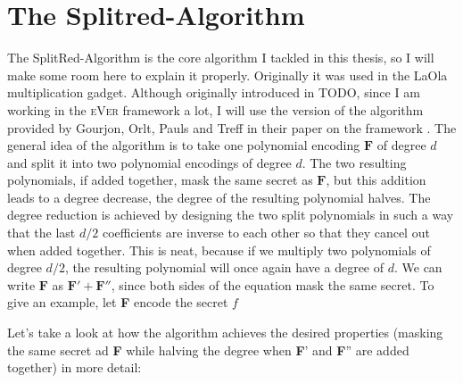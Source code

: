 \documentclass[english, version-2020-11]{uzl-thesis}
\newcommand{\toolname}[1]{\textsc{#1}}
\begin{document}

    \section{The Splitred-Algorithm}
    \label{sec:splitred}
    The SplitRed-Algorithm is the core algorithm I tackled in this thesis, so I will make some room here to explain it properly. Originally it was used in the LaOla multiplication gadget.
    Although originally introduced in TODO, since I am working in the \toolname{eVer} framework a lot, I will use the version of the algorithm provided by Gourjon, Orlt, Pauls and Treff in their paper on the framework \cite{eVer2026}.
    The general idea of the algorithm is to take one polynomial encoding $\mathbf{F}$ of degree $d$ and split it into two polynomial encodings of degree $d$. The two resulting polynomials, if added together, mask the same secret as $\mathbf{F}$, but this addition leads to a degree decrease, 
    the degree of the resulting polynomial halves. The degree reduction is achieved by designing the two split polynomials in such a way that the last $d/2$ coefficients are inverse to each other so that they cancel out when added together. This is neat, because if we multiply two polynomials of degree $d/2$, the resulting polynomial will once again have a degree of $d$. 
    We can write $\mathbf{F}$ as $\mathbf{F}'+\mathbf{F}''$, since both sides of the equation mask the same secret. To give an example, let \textbf{F} encode the secret $f$ 

    Let's take a look at how the algorithm achieves the desired properties (masking the same secret ad \textbf{F} while halving the degree when \textbf{F}' and \textbf{F}'' are added together) in more detail:
\end{document}
